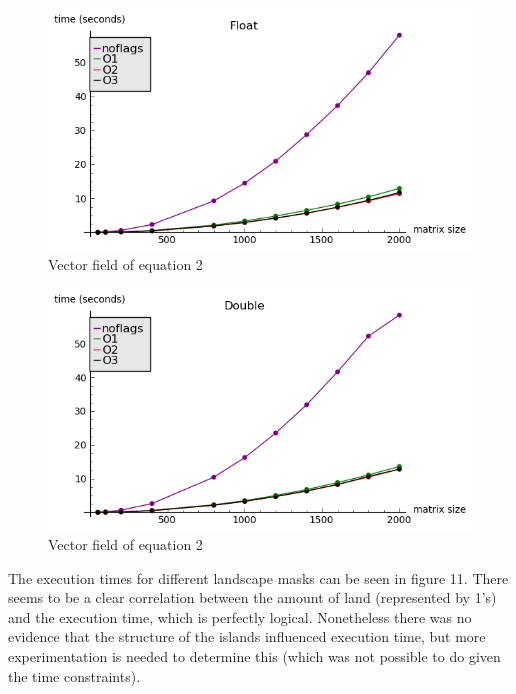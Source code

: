 \documentclass[12pt,a4paper]{article}
\begin{document}
\begin{figure}[hb]
    \centering
    \includegraphics[scale=0.6]{images/float.png}
    \caption{Vector field of equation 2}
\end{figure}

\begin{figure}[hb]
    \centering
    \includegraphics[scale=0.6]{images/double.png}
    \caption{Vector field of equation 2}
\end{figure}



The execution times for different landscape masks can be seen in figure 11. There seems to be a clear correlation between the amount of land (represented by 1's) and the execution time, which is perfectly logical. Nonetheless there was no evidence that the structure of the islands influenced execution time, but more experimentation is needed to determine this (which was not possible to do given the time constraints).
\end{document}
